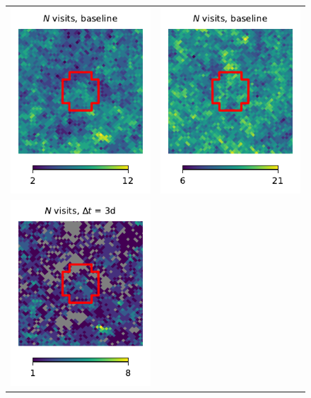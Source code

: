 \documentclass[preprintm,linenumbers]{aastex631}
\begin{document}
\begin{figure}
\begin{tabular}{@{}c@{}c@{}}
				\includegraphics{results/skymaps_cutout/skymaps_cutout_first_year_one_snap_v4_0_10yrs_db_noDD_noTwi_nside-256_CountMetric_r_NES_noDD_noTwi.pdf} &
				\includegraphics{results/skymaps_cutout/skymaps_cutout_first_year_one_snap_v4_0_10yrs_db_noDD_noTwi_nside-256_CountMetric_r_WFD_noDD_noTwi.pdf} \\
				\includegraphics{results/skymaps_cutout/skymaps_cutout_first_year_one_snap_v4_0_10yrs_db_noDD_noTwi_tscale-3_nside-256_doAllTemplateMetrics_reduceCount_r_NES_noDD_noTwi.pdf} &

\end{tabular}
\end{figure}
\end{document}
